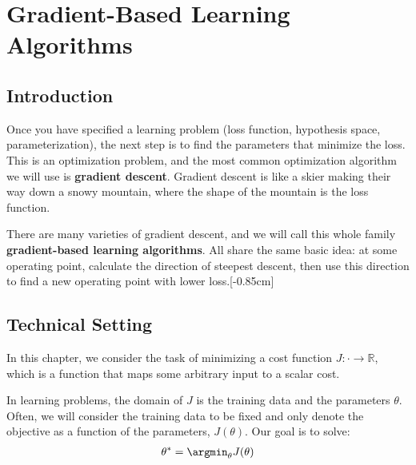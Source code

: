 \chapter{Gradient-Based Learning Algorithms}\label{chapter:gradient_descent}


\section{Introduction}

Once you have specified a learning problem (loss function, hypothesis space, parameterization), the next step is to find the parameters that minimize the loss. This is an optimization problem, and the most common optimization algorithm we will use is \textbf{gradient descent}. Gradient descent is like a skier making their way down a snowy mountain, where the shape of the mountain is the loss function.

There are many varieties of gradient descent, and we will call this whole family \textbf{gradient-based learning algorithms}. All share the same basic idea: at some operating point, calculate the direction of steepest descent, then use this direction to find a new operating point with lower loss.[-0.85cm]

\section{Technical Setting}
In this chapter, we consider the task of minimizing a cost function $J: \cdot \rightarrow \mathbb{R}$, which is a function that maps some arbitrary input to a scalar cost. %

In learning problems, the domain of $J$ is the training data and the parameters $\theta$. Often, we will consider the training data to be fixed and only denote the objective as a function of the parameters, $J(\theta)$. Our goal is to solve:
\begin{align}
    \theta^* = \argmin_{\theta} J(\theta)
\end{align}

